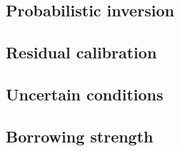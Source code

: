 \subsection{Probabilistic inversion} \label{sec:PEM:CaseStudies:ProbInv}


\subsection{Residual calibration} \label{sec:PEM:CaseStudies:ResCal}


\subsection{Uncertain conditions} \label{sec:PEM:CaseStudies:AddPres}


\subsection{Borrowing strength} \label{sec:PEM:CaseStudies:CombInf}
